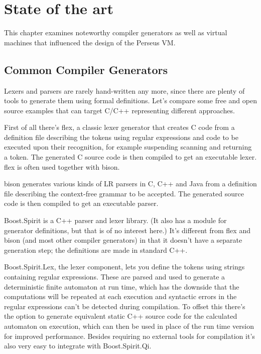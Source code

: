 
\chapter{State of the art}
	
	
	This chapter examines noteworthy compiler generators as well as virtual machines
	that influenced the design of the Perseus
	VM.
	
	\section{Common Compiler Generators}
    	
		Lexers and parsers are rarely hand-written any more, since there are plenty of tools to generate them using formal definitions. Let's compare some free and open source examples that can target C/C++ representing different approaches.
		
		First of all there's flex\cite{flex}, a classic lexer generator that creates C code from a definition file describing the tokens using regular expressions and code to be executed upon their recognition, for example suspending scanning and returning a token. The generated C source code is then compiled to get an executable lexer. flex is often used together with bison.
		
		bison\cite{bison} generates various kinds of LR parsers in C, C++ and Java from a definition file describing the context-free grammar to be accepted. The generated source code is then compiled to get an executable parser.
		
		Boost.Spirit\cite{spirit} is a C++ parser and lexer library. (It also has a module for generator definitions, but that is of no interest here.) It's different from flex and bison (and most other compiler generators) in that it doesn't have a separate generation step; the definitions are made in standard C++.
		
		Boost.Spirit.Lex, the lexer component, lets you define the tokens using strings containing regular expressions. These are parsed and used to generate a deterministic finite automaton at run time, which has the downside that the computations will be repeated at each execution and syntactic errors in the regular expressions can't be detected during compilation. To offset this there's the option to generate equivalent static C++ source code for the calculated automaton on execution, which can then be used in place of the run time version for improved performance. Besides requiring no external tools for compilation it's also very easy to integrate with Boost.Spirit.Qi.
		
